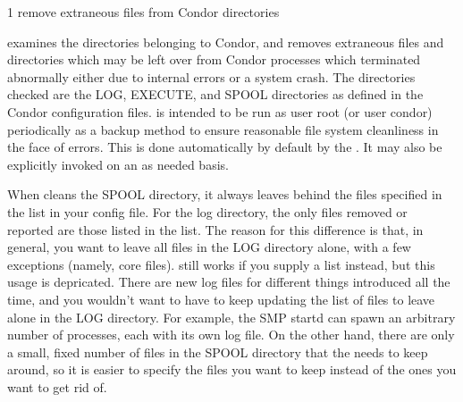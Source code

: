 \begin{ManPage}{\label{man-condor-preen}}{1}
{remove extraneous files from Condor directories}
\Synopsis {}


\Description 

 examines the directories belonging to Condor, 
and removes extraneous files and directories which may be left over from
Condor processes which terminated abnormally either due to internal errors or
a system crash. The directories checked are the LOG, EXECUTE, and SPOOL
directories as defined in the Condor configuration files.  is
intended to be run as user root (or user condor) periodically as a backup
method to ensure reasonable file system cleanliness in the face of
errors. This is done automatically by default by the . 
It may also be explicitly invoked on an as needed basis.

When  cleans the SPOOL directory, it always leaves
behind the files specified in the  list in
your config file.
For the log directory, the only files removed or reported are those
listed in the   list.
The reason for this difference is that, in general, you want to leave
all files in the LOG directory alone, with a few exceptions (namely,
core files).
 still works if you supply a 
list instead, but this usage is depricated.
There are new log files for different things introduced all the time,
and you wouldn't want to have to keep updating the list of files to
leave alone in the LOG directory.
For example, the SMP startd can spawn an arbitrary number of
 processes, each with its own log file.  
On the other hand, there are only a small, fixed number of files in
the SPOOL directory that the  needs to keep around, so
it is easier to specify the files you want to keep instead of the ones
you want to get rid of.

\begin{Options}




\end{Options}

\end{ManPage}
